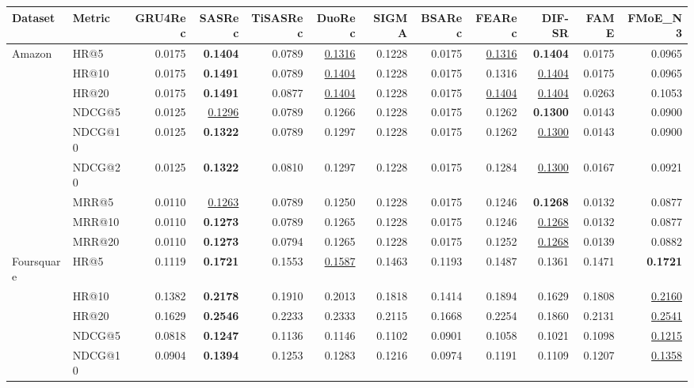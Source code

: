 \begin{tabular}{llrrrrrrrrrr}
\hline
Dataset & Metric & GRU4Rec & SASRec & TiSASRec & DuoRec & SIGMA & BSARec & FEARec & DIF-SR & FAME & FMoE\_N3 \\
\hline
Amazon & HR@5 & 0.0175 & \textbf{0.1404} & 0.0789 & \underline{0.1316} & 0.1228 & 0.0175 & \underline{0.1316} & \textbf{0.1404} & 0.0175 & 0.0965 \\
 & HR@10 & 0.0175 & \textbf{0.1491} & 0.0789 & \underline{0.1404} & 0.1228 & 0.0175 & 0.1316 & \underline{0.1404} & 0.0175 & 0.0965 \\
 & HR@20 & 0.0175 & \textbf{0.1491} & 0.0877 & \underline{0.1404} & 0.1228 & 0.0175 & \underline{0.1404} & \underline{0.1404} & 0.0263 & 0.1053 \\
 & NDCG@5 & 0.0125 & \underline{0.1296} & 0.0789 & 0.1266 & 0.1228 & 0.0175 & 0.1262 & \textbf{0.1300} & 0.0143 & 0.0900 \\
 & NDCG@10 & 0.0125 & \textbf{0.1322} & 0.0789 & 0.1297 & 0.1228 & 0.0175 & 0.1262 & \underline{0.1300} & 0.0143 & 0.0900 \\
 & NDCG@20 & 0.0125 & \textbf{0.1322} & 0.0810 & 0.1297 & 0.1228 & 0.0175 & 0.1284 & \underline{0.1300} & 0.0167 & 0.0921 \\
 & MRR@5 & 0.0110 & \underline{0.1263} & 0.0789 & 0.1250 & 0.1228 & 0.0175 & 0.1246 & \textbf{0.1268} & 0.0132 & 0.0877 \\
 & MRR@10 & 0.0110 & \textbf{0.1273} & 0.0789 & 0.1265 & 0.1228 & 0.0175 & 0.1246 & \underline{0.1268} & 0.0132 & 0.0877 \\
 & MRR@20 & 0.0110 & \textbf{0.1273} & 0.0794 & 0.1265 & 0.1228 & 0.0175 & 0.1252 & \underline{0.1268} & 0.0139 & 0.0882 \\
\hline
Foursquare & HR@5 & 0.1119 & \textbf{0.1721} & 0.1553 & \underline{0.1587} & 0.1463 & 0.1193 & 0.1487 & 0.1361 & 0.1471 & \textbf{0.1721} \\
 & HR@10 & 0.1382 & \textbf{0.2178} & 0.1910 & 0.2013 & 0.1818 & 0.1414 & 0.1894 & 0.1629 & 0.1808 & \underline{0.2160} \\
 & HR@20 & 0.1629 & \textbf{0.2546} & 0.2233 & 0.2333 & 0.2115 & 0.1668 & 0.2254 & 0.1860 & 0.2131 & \underline{0.2541} \\
 & NDCG@5 & 0.0818 & \textbf{0.1247} & 0.1136 & 0.1146 & 0.1102 & 0.0901 & 0.1058 & 0.1021 & 0.1098 & \underline{0.1215} \\
 & NDCG@10 & 0.0904 & \textbf{0.1394} & 0.1253 & 0.1283 & 0.1216 & 0.0974 & 0.1191 & 0.1109 & 0.1207 & \underline{0.1358} \\

\end{tabular}
